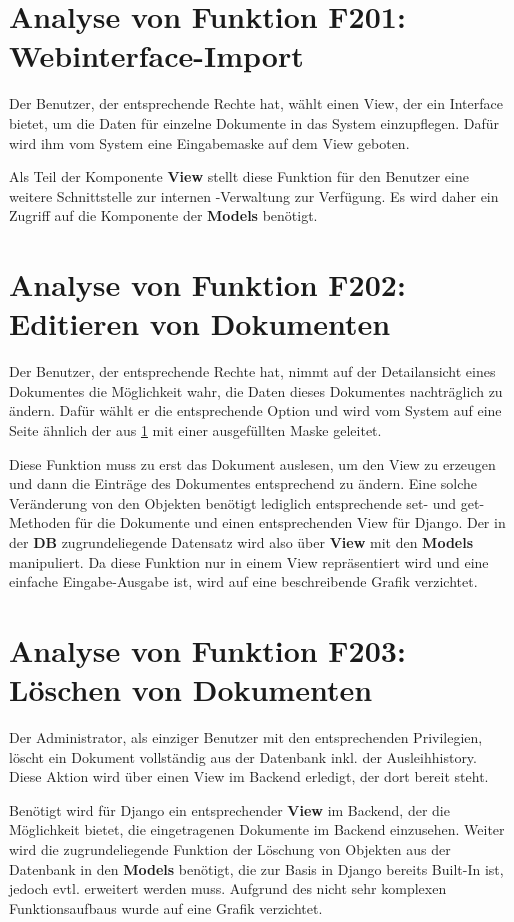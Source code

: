 \section{Analyse von Funktion F201: Webinterface-Import}
\label{f:201}
Der Benutzer, der entsprechende Rechte hat, wählt einen View, der ein Interface
bietet, um die Daten für einzelne Dokumente in das System einzupflegen. Dafür
wird ihm vom System eine Eingabemaske auf dem View geboten.

Als Teil der Komponente \textbf{View} stellt diese Funktion für den
Benutzer eine weitere Schnittstelle zur internen \BibTeX -Verwaltung zur Verfügung. Es wird
daher ein Zugriff auf die Komponente der \textbf{Models} benötigt.

\section{Analyse von Funktion F202: Editieren von Dokumenten}
Der Benutzer, der entsprechende Rechte hat, nimmt auf der Detailansicht eines
Dokumentes die Möglichkeit wahr, die Daten dieses Dokumentes nachträglich zu ändern. Dafür
wählt er die entsprechende Option und wird vom System auf eine Seite ähnlich der
aus \ref{f:201}  mit einer ausgefüllten Maske geleitet.

Diese Funktion muss zu erst das Dokument auslesen, um den View zu erzeugen und
dann die Einträge des Dokumentes entsprechend zu ändern. Eine solche Veränderung
von den Objekten benötigt lediglich entsprechende set- und get-Methoden für die
Dokumente und einen entsprechenden View für Django. Der in der
\textbf{DB} zugrundeliegende Datensatz wird also über \textbf{View} mit
den \textbf{Models} manipuliert. Da diese Funktion nur in einem View
repräsentiert wird und eine einfache Eingabe-Ausgabe ist, wird auf eine
beschreibende Grafik verzichtet.

\section{Analyse von Funktion F203: Löschen von Dokumenten}
Der Administrator, als einziger Benutzer mit den entsprechenden Privilegien,
löscht ein Dokument vollständig aus der Datenbank inkl. der Ausleihhistory.
Diese Aktion wird über einen View im Backend erledigt, der dort bereit steht.

Benötigt wird für Django ein entsprechender \textbf{View} im Backend, der die
Möglichkeit bietet, die eingetragenen Dokumente im Backend einzusehen. Weiter
wird die zugrundeliegende Funktion der Löschung von Objekten aus der Datenbank
in den \textbf{Models} benötigt, die zur Basis in Django bereits Built-In ist,
jedoch evtl. erweitert werden muss. Aufgrund des nicht sehr komplexen
Funktionsaufbaus wurde auf eine Grafik verzichtet.

